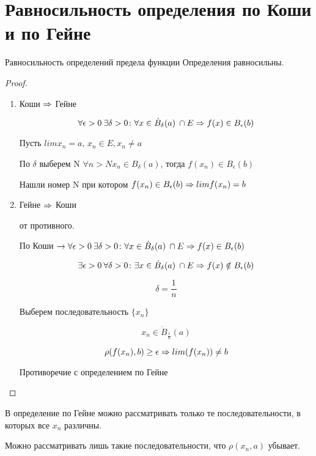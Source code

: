 ﻿\section{Равносильность определения по Коши и по Гейне}

\begin{theorem}{Равносильность определений предела функции}
Определения равносильны.
\end{theorem}

\begin{proof}
\begin{enumerate}
\item Коши $\Rightarrow$ Гейне

$$\forall \epsilon>0\: \exists \delta > 0\colon \forall x \in \dot B_\delta(a)\: \cap E \Rightarrow f(x) \in B_\epsilon (b)$$

Пусть $lim x_n = a$, $x_n \in E, x_n \ne a$

По $\delta$ выберем N $\forall n > N x_n \in B_{\delta}(a)$, тогда $f(x_n) \in B_{\epsilon}(b)$

Нашли номер N при котором $f(x_n) \in B_{\epsilon}(b) \Rightarrow lim f(x_n) = b$ 

\item Гейне $\Rightarrow$ Коши

от противного.

По Коши $\to \forall \epsilon>0\: \exists \delta > 0\colon \forall x \in \dot B_\delta(a)\: \cap E \Rightarrow f(x) \in B_\epsilon (b)$

$$\exists \epsilon>0\: \forall \delta > 0\colon \exists x \in \dot B_\delta(a)\: \cap E \Rightarrow f(x) \notin B_\epsilon (b)$$

$$\delta = \frac{1}{n}$$

Выберем последовательность $\{x_n\}$

$$x_n \in \dot B_{\frac1n}(a)$$

$$\rho(f(x_n), b) \ge \epsilon \Rightarrow lim(f(x_n)) \ne b$$

Противоречие с определением по Гейне
\end{enumerate}

\end{proof}

\begin{Rem}
В определение по Гейне можно рассматривать только те последовательности, в которых все $x_n$ различны.
\end{Rem}
\begin{Rem}
Можно рассматривать лишь такие последовательности, что $\rho(x_n, a)$ убывает.
\end{Rem}


